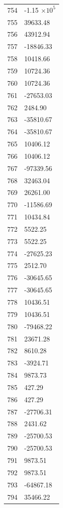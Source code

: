 \documentclass[a4paper,11pt]{article}
\begin{document}
\begin{center}
\begin{longtable}{|R{1.5cm}|R{2.6cm}|}
  754 &        -1.15 $\times 10^{           5}$ \\
  755 &     39633.48 \\
  756 &     43912.94 \\
  757 &    -18846.33 \\
  758 &     10418.66 \\
  759 &     10724.36 \\
  760 &     10724.36 \\
  761 &    -27653.03 \\
  762 &      2484.90 \\
  763 &    -35810.67 \\
  764 &    -35810.67 \\
  765 &     10406.12 \\
  766 &     10406.12 \\
  767 &    -97339.56 \\
  768 &     32463.04 \\
  769 &     26261.00 \\
  770 &    -11586.69 \\
  771 &     10434.84 \\
  772 &      5522.25 \\
  773 &      5522.25 \\
  774 &    -27625.23 \\
  775 &      2512.70 \\
  776 &    -30645.65 \\
  777 &    -30645.65 \\
  778 &     10436.51 \\
  779 &     10436.51 \\
  780 &    -79468.22 \\
  781 &     23671.28 \\
  782 &      8610.28 \\
  783 &     -3924.71 \\
  784 &      9873.73 \\
  785 &       427.29 \\
  786 &       427.29 \\
  787 &    -27706.31 \\
  788 &      2431.62 \\
  789 &    -25700.53 \\
  790 &    -25700.53 \\
  791 &      9873.51 \\
  792 &      9873.51 \\
  793 &    -64867.18 \\
  794 &     35466.22 \\

\end{longtable}
\end{center}
\end{document}
